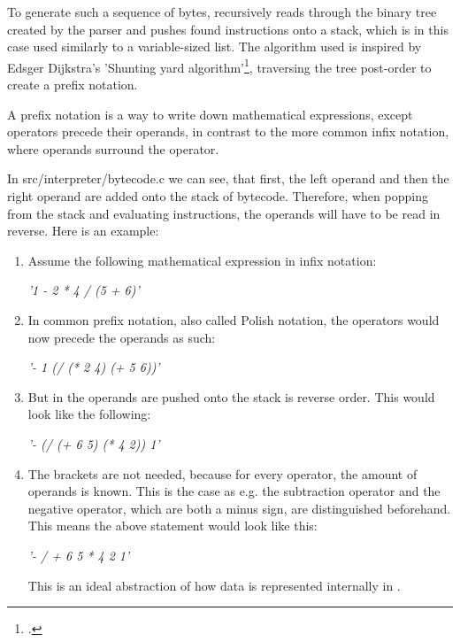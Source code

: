 \documentclass[12pt,a4paper,man]{apa7}
\begin{document}
To generate such a sequence of bytes, \name recursively reads through the
binary tree created by the parser and pushes found instructions onto a stack,
which is in this case used similarly to a variable-sized list.
The algorithm used is inspired by Edsger Dijkstra's 'Shunting yard 
algorithm'\footcite{shunting_yard}, traversing the tree post-order to create
a prefix notation. 

A prefix notation is a way to write down mathematical expressions, except
operators precede their operands, in contrast to the more common infix notation,
where operands surround the operator.

In src/interpreter/bytecode.c we can see, that first, the left operand and then
the right operand are added onto the stack of bytecode. Therefore, when
popping from the stack and evaluating instructions, the operands will have to
be read in reverse.
Here is an example:
\begin{enumerate}
    \item Assume the following mathematical expression in infix notation:
        \begin{center}
            \emph{'1 - 2 * 4 / (5 + 6)'}
        \end{center}
    \item In common prefix notation, also called Polish notation, the
        operators would now precede the operands as such:
        \begin{center}
            \emph{'- 1 (/ (* 2 4) (+ 5 6))'}
        \end{center}
    \item But in \name the operands are pushed onto the stack is reverse order.
        This would look like the following:
        \begin{center}
            \emph{'- (/ (+ 6 5) (* 4 2)) 1'}
        \end{center}
    \item The brackets are not needed, because for every operator, the amount
        of operands is known. This is the case as e.g. the subtraction operator
        and the negative operator, which are both a minus sign, are distinguished
        beforehand. This means the above statement would look like this:
        \begin{center}
            \emph{'- / + 6 5 * 4 2 1'}
        \end{center} 
        This is an ideal abstraction of how data 
        is represented internally in \name.
\end{enumerate}
\end{document}
